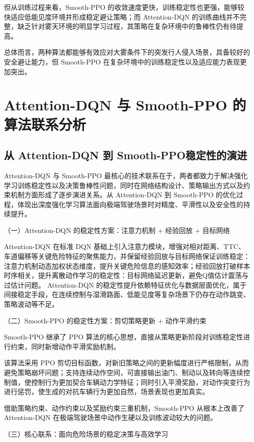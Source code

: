 但从训练过程来看，Smooth-PPO 的收敛速度更快，训练稳定性也更强，能够较快适应低能见度环境并形成稳定避让策略；而 Attention-DQN 的训练曲线并不完整，缺乏针对雾天环境的明显学习过程，其策略在复杂环境中的鲁棒性仍有待提高。

总体而言，两种算法都能够有效应对大雾条件下的突发行人侵入场景，具备较好的安全避让能力，但 Smooth-PPO 在复杂环境中的训练稳定性以及适应能力表现更加突出。

\section{Attention-DQN 与 Smooth-PPO 的算法联系分析}
\subsection{从 Attention-DQN 到 Smooth-PPO稳定性的演进}
Attention-DQN 与 Smooth-PPO 最核心的技术联系在于，两者都致力于解决强化学习训练稳定性以及决策鲁棒性问题，同时在网络结构设计、策略输出方式以及约束机制方面形成了逐步演进关系。从 Attention-DQN 到 Smooth-PPO 的优化过程，体现出深度强化学习算法面向极端驾驶场景时对精度、平滑性以及安全性的持续提升。

（一）Attention-DQN 的稳定性方案：注意力机制 + 经验回放 + 目标网络

Attention-DQN 在标准 DQN 基础上引入注意力模块，增强对相对距离、TTC、车道偏移等关键危险特征的聚焦能力，并保留经验回放与目标网络保证训练稳定：注意力机制动态加权状态维度，提升关键危险信息的感知效率；经验回放打破样本时序相关，提升离散动作学习的稳定性：目标网络延迟更新，避免Q值估计震荡与过估计问题。 Attention-DQN 的稳定性提升依赖特征优化与数据层面优化，属于间接稳定手段，在连续控制与湿滑路面、低能见度等复杂场景下仍存在动作跳变、策略波动等不足。

（二）Smooth-PPO 的稳定性方案：剪切策略更新 + 动作平滑约束

Smooth-PPO 继承了 PPO 算法的核心思想，直接从策略更新阶段对训练稳定性进行约束，同时新增动作平滑奖励机制。

该算法采用 PPO 剪切目标函数，对新旧策略之间的更新幅度进行严格限制，从而避免策略崩坏问题；支持连续动作空间，可直接输出油门、制动以及转向等连续控制值，使控制行为更加契合车辆动力学特征；同时引入平滑奖励，对动作突变行为进行惩罚，使生成的对抗车辆行为更加自然，场景表现也更加真实。

借助策略约束、动作约束以及奖励约束三重机制，Smooth-PPO 从根本上改善了 Attention-DQN 在极端驾驶场景中动作生硬以及训练波动较大的问题。

（三）核心联系：面向危险场景的稳定决策与高效学习

